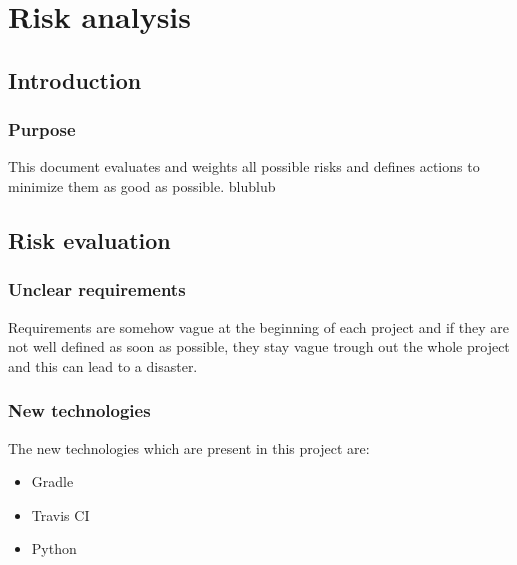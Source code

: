
\chapter{Risk analysis} %

\label{ChapterX} %



\section{Introduction}

\subsection{Purpose}

This document evaluates and weights all possible risks and defines actions to minimize them as good as possible.
blublub

\section{Risk evaluation}

\subsection{Unclear requirements}

Requirements are somehow vague at the beginning of each project and if they are not well defined as soon as possible, they stay vague trough out the whole project and this can lead to a disaster. 

\subsection{New technologies}

The new technologies which are present in this project are:

 \begin{itemize}
    \item Gradle
    \item Travis CI
    \item Python
\end{itemize}

